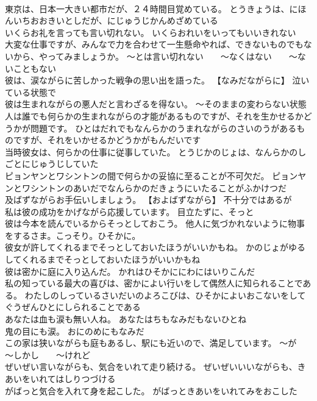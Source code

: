 \documentclass[8pt]{extreport}
\begin{document}
\begin{CJK}{UTF8}{min}
\\	東京は、日本一大きい都市だが、２４時間目覚めている。	とうきょうは、にほんいちおおきいとしだが、にじゅうじかんめざめている 
\\	いくらお礼を言っても言い切れない。	いくらおれいをいってもいいきれない 
\\	大変な仕事ですが、みんなで力を合わせて一生懸命やれば、できないものでもないから、やってみましょうか。	～とは言い切れない　　～なくはない　　～ないこともない
\\	彼は、涙ながらに苦しかった戦争の思い出を語った。	【なみだながらに】 泣いている状態で
\\	彼は生まれながらの悪人だと言わざるを得ない。	～そのままの変わらない状態
\\	人は誰でも何らかの生まれながらの才能があるものですが、それを生かせるかどうかが問題です。	ひとはだれでもなんらかのうまれながらのさいのうがあるものですが、それをいかせるかどうかがもんだいです 
\\	当時彼女は、何らかの仕事に従事していた。	とうじかのじょは、なんらかのしごとにじゅうじしていた 
\\	ピョンヤンとワシントンの間で何らかの妥協に至ることが不可欠だ。	ピョンヤンとワシントンのあいだでなんらかのだきょうにいたることがふかけつだ 
\\	及ばずながらお手伝いしましょう。	【およばずながら】 不十分ではあるが
\\	私は彼の成功をかげながら応援しています。	目立たずに、そっと
\\	彼は今本を読んでいるからそっとしておこう。	他人に気づかれないように物事をするさま。こっそり。ひそかに。
\\	彼女が許してくれるまでそっとしておいたほうがいいかもね。	かのじょがゆるしてくれるまでそっとしておいたほうがいいかもね 
\\	彼は密かに庭に入り込んだ。	かれはひそかににわにはいりこんだ 
\\	私の知っている最大の喜びは、密かによい行いをして偶然人に知られることである。	わたしのしっているさいだいのよろこびは、ひそかによいおこないをしてぐうぜんひとにしられることである 
\\	あなたは血も涙も無い人ね。	あなたはちもなみだもないひとね 
\\	鬼の目にも涙。	おにのめにもなみだ 
\\	この家は狭いながらも庭もあるし、駅にも近いので、満足しています。	～が　　～しかし　　～けれど
\\	ぜいぜい言いながらも、気合をいれて走り続ける。	ぜいぜいいいながらも、きあいをいれてはしりつづける 
\\	がばっと気合を入れて身を起こした。	がばっときあいをいれてみをおこした 

\end{CJK}
\end{document}
